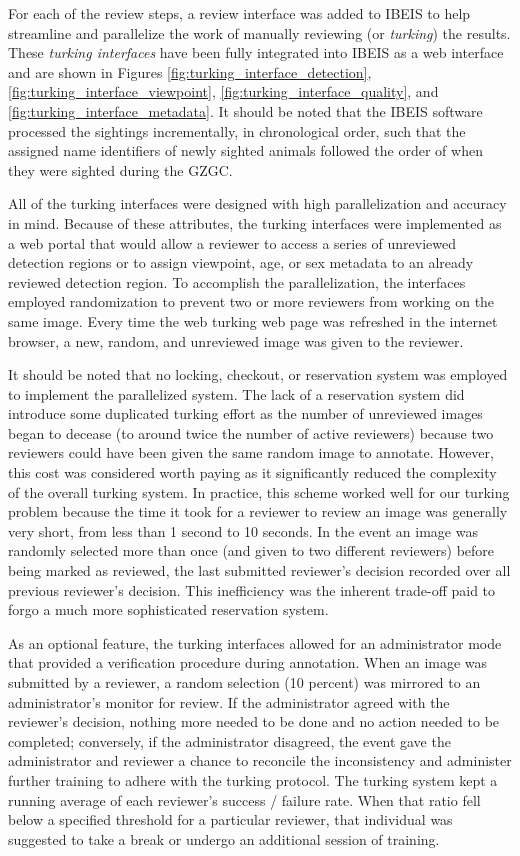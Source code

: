 For each of the review steps, a review interface was added to IBEIS to help streamline and parallelize the work of manually reviewing  (or \textit{turking}) the results.  These \textit{turking interfaces} have been fully integrated into IBEIS as a web interface and are shown in Figures \ref{fig:turking_interface_detection}, \ref{fig:turking_interface_viewpoint}, \ref{fig:turking_interface_quality}, and \ref{fig:turking_interface_metadata}.  It should be noted that the IBEIS software processed the sightings incrementally, in chronological order, such that the assigned name identifiers of newly sighted animals followed the order of when they were sighted during the GZGC.

All of the turking interfaces were designed with high parallelization and accuracy in mind.  Because of these attributes, the turking interfaces were implemented as a web portal that would allow a reviewer to access a series of unreviewed detection regions or to assign viewpoint, age, or sex metadata to an already reviewed detection region.  To accomplish the parallelization, the interfaces employed randomization to prevent two or more reviewers from working on the same image.  Every time the web turking web page was refreshed in the internet browser, a new, random, and unreviewed image was given to the reviewer.

It should be noted that no locking, checkout, or reservation system was employed to implement the parallelized system.  The lack of a reservation system did introduce some duplicated turking effort as the number of unreviewed images began to decease (to around twice the number of active reviewers) because two reviewers could have been given the same random image to annotate.  However, this cost was considered worth paying as it significantly reduced the complexity of the overall turking system.  In practice, this scheme worked well for our turking problem because the time it took for a reviewer to review an image was generally very short, from less than 1 second to 10 seconds.  In the event an image was randomly selected more than once (and given to two different reviewers) before being marked as reviewed, the last submitted reviewer's decision recorded over all previous reviewer's decision.  This inefficiency was the inherent trade-off paid to forgo a much more sophisticated reservation system.

As an optional feature, the turking interfaces allowed for an administrator mode that provided a verification procedure during annotation.  When an image was submitted by a reviewer, a random selection (10 percent) was mirrored to an administrator's monitor for review.  If the administrator agreed with the reviewer's decision, nothing more needed to be done and no action needed to be completed; conversely, if the administrator disagreed, the event gave the administrator and reviewer a chance to reconcile the inconsistency and administer further training to adhere with the turking protocol.  The turking system kept a running average of each reviewer's success / failure rate.  When that ratio fell below a specified threshold for a particular reviewer, that individual was suggested to take a break or undergo an additional session of training.

